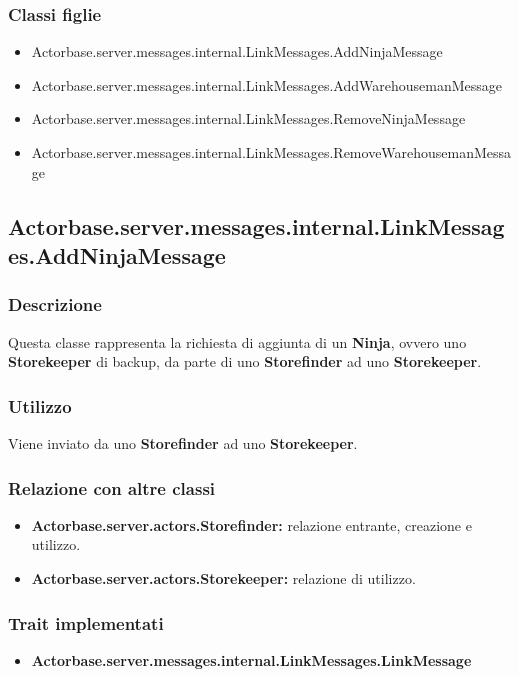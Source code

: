 \documentclass[a4paper]{article}
\begin{document}
			\subsubsection{Classi figlie}
				\begin{itemize}
					\item Actorbase.server.messages.internal.LinkMessages.AddNinjaMessage
					\item Actorbase.server.messages.internal.LinkMessages.AddWarehousemanMessage
					\item Actorbase.server.messages.internal.LinkMessages.RemoveNinjaMessage
					\item Actorbase.server.messages.internal.LinkMessages.RemoveWarehousemanMessage
				\end{itemize}
				
		\subsection{Actorbase.server.messages.internal.LinkMessages.AddNinjaMessage}
			\subsubsection{Descrizione}
				Questa classe rappresenta la richiesta di aggiunta di un \textbf{Ninja}, ovvero uno \textbf{Storekeeper} di backup, da 
				parte di uno \textbf{Storefinder} ad uno \textbf{Storekeeper}.
				
			\subsubsection{Utilizzo}
				Viene inviato da uno \textbf{Storefinder} ad uno \textbf{Storekeeper}.
				
			\subsubsection{Relazione con altre classi}
				\begin{itemize}
					\item \textbf{Actorbase.server.actors.Storefinder:} relazione entrante, creazione e utilizzo.
					\item \textbf{Actorbase.server.actors.Storekeeper:} relazione di utilizzo.
				\end{itemize}
				
			\subsubsection{Trait implementati}
				\begin{itemize}
					\item \textbf{Actorbase.server.messages.internal.LinkMessages.LinkMessage} 
				\end{itemize}
				
\end{document}
